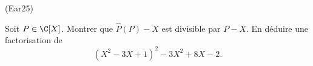\begin{tiny}(Ear25)\end{tiny} Soit $P \in \C[X]$. Montrer que $\widehat{P}(P) - X$ est divisible par $P - X$. En déduire une factorisation de
\[
  (X^2-3X+1)^2-3X^2+8X-2.
\]
